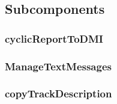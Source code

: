 \subsection{Subcomponents}\label{s:ManageDMIOutput_subcomponents}


\subsubsection{cyclicReportToDMI}


\subsubsection{ManageTextMessages}


\subsubsection{copyTrackDescription}


%
%
%

%

%

%
%
%







